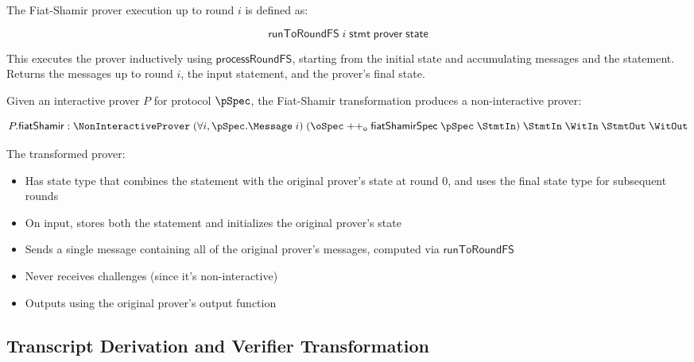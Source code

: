 \begin{definition}
    \label{def:prover_run_to_round_fs}
    The Fiat-Shamir prover execution up to round $i$ is defined as:

    \[ \mathsf{runToRoundFS} \;i \;\mathsf{stmt} \;\mathsf{prover} \;\mathsf{state} \]

    This executes the prover inductively using $\mathsf{processRoundFS}$, starting from the initial state and accumulating messages and the statement. Returns the messages up to round $i$, the input statement, and the prover's final state.
\end{definition}

\begin{definition}
    \label{def:prover_fiat_shamir}
    Given an interactive prover $P$ for protocol $\pSpec$, the Fiat-Shamir transformation produces a non-interactive prover:

    \[ P.\mathsf{fiatShamir} : \NonInteractiveProver \;(\forall i, \pSpec.\Message \;i) \;(\oSpec \mathrel{++_\mathsf{o}} \mathsf{fiatShamirSpec} \;\pSpec \;\StmtIn) \;\StmtIn \;\WitIn \;\StmtOut \;\WitOut \]

    The transformed prover:
    \begin{itemize}
        \item Has state type that combines the statement with the original prover's state at round 0, and uses the final state type for subsequent rounds
        \item On input, stores both the statement and initializes the original prover's state
        \item Sends a single message containing all of the original prover's messages, computed via $\mathsf{runToRoundFS}$
        \item Never receives challenges (since it's non-interactive)
        \item Outputs using the original prover's output function
    \end{itemize}
\end{definition}

\subsection{Transcript Derivation and Verifier Transformation}\label{sec:fiat_shamir_verifier}

